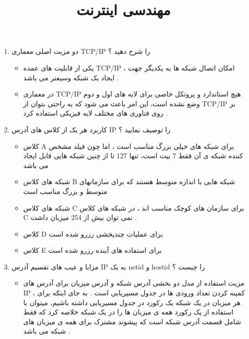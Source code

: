\documentclass{article}
\begin{document}
\title{مهندسی اینترنت}
\maketitle

\begin{enumerate}
\item    دو مزیت اصلی معماری TCP/IP را شرح دهید ؟

\begin{tcolorbox}
\begin{itemize}
	\item یکی از قابلیت های عمده TCP/IP
	، امکان  اتصال شبکه ها به یکدیگر جهت ایجاد یک شبکه وسیعتر می باشد .
	
	\item در معماری TCP/IP
	هیچ استاندارد و پروتکل خاصی برای لایه های اول و دوم وضع نشده است، این امر باعث می شود که به راحتی بتوان از 
	TCP/IP
	بر روی فناوری های مختلف لایه فیزیکی استفاده کرد .
\end{itemize}
\end{tcolorbox}

\item کاربرد هر یک از کلاس های آدرس IP را توصیف نمایید ؟

\begin{tcolorbox}
\begin{itemize}
	\item کلاس A برای شبکه های خیلی بزرگ مناسب است
	، اما چون فیلد مشخص کننده شبکه ی آن فقط 7 بیت است، تنها 127 تا از چنین شبکه هایی قابل ایجاد می باشد
	
	\item شبکه های کلاس B شبکه هایی با اندازه متوسط هستند که برای سازمانهای متوسط و بزرگ مناسب  است 
	
	\item شبکه های کلاس C برای سازمان های کوچک مناسب اند ، در شبکه های کلاس
	 C نمی توان بیش از 
	254 میزبان داشت .
	
	\item کلاس D برای عملیات چندپخشی رزرو شده است 
	
	\item کلاس E برای استفاده های آینده رزرو شده است 
	
\end{itemize}
\end{tcolorbox}

\item مزایا و عیب های تقسیم آدرس IP به یک netid و hostid را چیست ؟

\begin{tcolorbox}
\begin{itemize}
	\item مزیت استفاده از مدل دو بخشی آدرس شبکه و آدرس میزبان برای آدرس های IP
	، کمینه کردن تعداد ورودی ها در جدول مسیریابی است .
	به جای اینکه برای هر میزبان در یک شبکه یک رکورد در جدول مسیریابی داشته باشیم، میتوان با استفاده از یک رکورد همه ی میزبان ها را در یک شبکه خلاصه کرد که فقط شامل قسمت آدرس شبکه است که پیشوند مشترک برای همه ی میزبان های شبکه می باشد .
\end{itemize}
\end{tcolorbox}



\end{enumerate}
\end{document}
